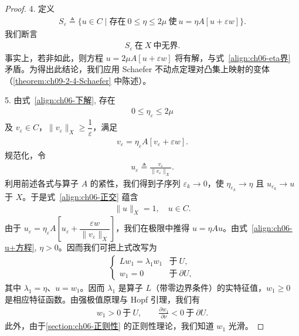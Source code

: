 \documentclass[../../main.tex]{subfiles}
\begin{document}
\begin{proof}
4. 定义
\begin{align*}
S_{\varepsilon}\triangleq\{u\in C\mid\text{存在}\ 0\leqslant\eta\leqslant 2\mu\ \text{使}\ u=\eta A[u+\varepsilon w]\}.
\end{align*}
我们断言
\begin{align}
S_{\varepsilon}\ \text{在}\ X\ \text{中无界}.
\end{align}
事实上，若非如此，则方程 $u=2\mu A[u+\varepsilon w]$ 将有解，与式~\eqref{align:ch06-eta界} 矛盾。为得出此结论，我们应用 Schaefer 不动点定理对凸集上映射的变体（\cref{theorem:ch09-2-4-Schaefer} 中陈述）。

5. 由式~\eqref{align:ch06-下解}, 存在
\begin{align}
0\leqslant\eta_{\varepsilon}\leqslant 2\mu
\end{align}
及 $v_{\varepsilon}\in C$，$\|v_{\varepsilon}\|_{X}\geqslant\dfrac{1}{\varepsilon}$，满足
\begin{align}
v_{\varepsilon}=\eta_{\varepsilon}A[v_{\varepsilon}+\varepsilon w].
\end{align}
规范化，令
\begin{align}
u_{\varepsilon}\triangleq\frac{v_{\varepsilon}}{\|v_{\varepsilon}\|_{X}}.
\end{align}
利用前述各式与算子 $A$ 的紧性，我们得到子序列 $\varepsilon_{k}\to 0$，使 $\eta_{\varepsilon_{k}}\to\eta$ 且 $u_{\varepsilon_{k}}\to u$ 于 $X$。于是式~\eqref{align:ch06-正交} 蕴含
\begin{align}
\|u\|_{X}=1,\quad u\in C.
\end{align}
由于 $u_{\varepsilon}=\eta_{\varepsilon}A\left[u_{\varepsilon}+\dfrac{\varepsilon w}{\|v_{\varepsilon}\|_{X}}\right]$，我们在极限中推得 $u=\eta Au$。由式~\eqref{align:ch06-u+方程}, $\eta>0$。因而我们可把上式改写为
\begin{align*}
\begin{cases}
Lw_{1}=\lambda_{1}w_{1} & \text{于}\ U,\\
w_{1}=0 & \text{于}\ \partial U,
\end{cases}
\end{align*}
其中 $\lambda_{1}=\eta$、$u=w_{1}$。因而 $\lambda_{1}$ 是算子 $L$（带零边界条件）的实特征值，$w_{1}\geqslant 0$ 是相应特征函数。由强极值原理与 Hopf 引理，我们有
\begin{align}
w_{1}>0\ \text{于}\ U,\qquad \frac{\partial w_{1}}{\partial\nu}<0\ \text{于}\ \partial U.
\end{align}
此外，由于\cref{section:ch06-正则性} 的正则性理论，我们知道 $w_{1}$ 光滑。


\end{proof}
\end{document}

